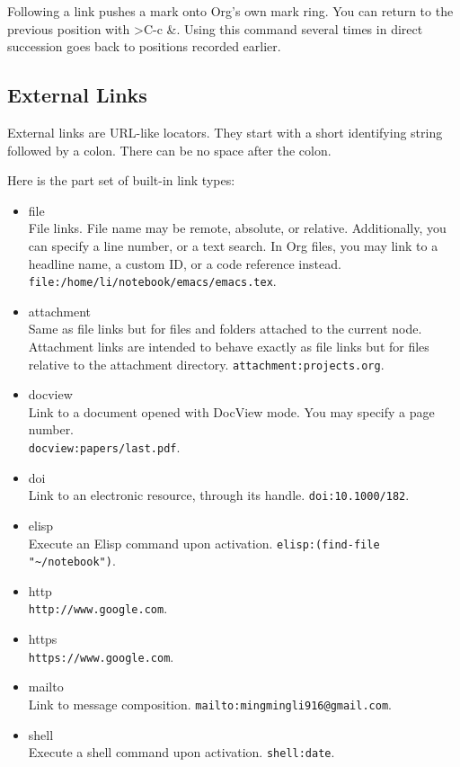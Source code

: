 Following a link pushes a mark onto Org’s own mark ring.
You can return to the previous position with \textgreater{C-c \&}.
Using this command several times in direct succession goes back to positions recorded earlier.


\subsection{External Links}
\label{sec:external-links}

External links are URL-like locators.
They start with a short identifying string followed by a colon.
There can be no space after the colon.


Here is the part set of built-in link types:
\begin{itemize}[itemsep=10pt]
\item file\\
  File links. File name may be remote, absolute, or relative.
  Additionally, you can specify a line number, or a text search.
  In Org files, you may link to a headline name, a custom ID, or a code reference instead.
  \verb|file:/home/li/notebook/emacs/emacs.tex|.
\item attachment\\
  Same as file links but for files and folders attached to the current node.
  Attachment links are intended to behave exactly as file links but for files relative to the attachment directory.
  \verb|attachment:projects.org|.
\item docview\\
  Link to a document opened with DocView mode.
  You may specify a page number.\\
  \verb|docview:papers/last.pdf|.
\item doi\\
  Link to an electronic resource, through its handle.
  \verb|doi:10.1000/182|.
\item elisp\\
  Execute an Elisp command upon activation.
  \verb|elisp:(find-file "~/notebook")|.
\item http\\
  \verb|http://www.google.com|.
\item https\\
  \verb|https://www.google.com|.
\item mailto\\
  Link to message composition.
  \verb|mailto:mingmingli916@gmail.com|.
\item shell\\
  Execute a shell command upon activation.
  \verb|shell:date|.
\end{itemize}




